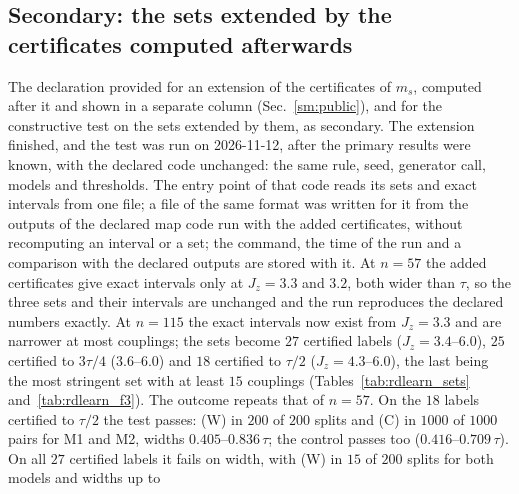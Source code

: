 \documentclass[aps,prx,onecolumn,10pt,nofootinbib,longbibliography,floatfix]{revtex4-2}
\theoremstyle{remark}
\newcommand{\Jz}{J_z}
\newcommand{\ms}{m_s}
\begin{document}
\subsection{Secondary: the sets extended by the certificates computed afterwards}

The declaration provided for an extension of the certificates of $\ms$, computed after it and shown in a separate
column (Sec.~\ref{sm:public}), and for the constructive test on the sets extended by them, as secondary. The
extension finished, and the test was run on 2026-11-12, after the primary results were known, with the declared %
code unchanged: the same rule, seed, generator call, models and thresholds. The entry point of that code reads its
sets and exact intervals from one file; a file of the same format was written for it from the outputs of the
declared map code run with the added certificates, without recomputing an interval or a set; the command, the time
of the run and a comparison with the declared outputs are stored with it. At $n=57$ the added certificates give exact intervals only at %
$\Jz=3.3$ and $3.2$, both wider than $\tau$, so the three sets and their intervals are unchanged and the run %
reproduces the declared numbers exactly. At $n=115$ the exact intervals now exist from $\Jz=3.3$ and are narrower %
at most couplings; the sets become $27$ certified labels ($\Jz=3.4$--$6.0$), $25$ certified to $3\tau/4$ %
($3.6$--$6.0$) and $18$ certified to $\tau/2$ ($\Jz=4.3$--$6.0$), the last being the most stringent set with at %
least $15$ couplings (Tables~\ref{tab:rdlearn_sets} and~\ref{tab:rdlearn_f3}). The outcome repeats that of $n=57$. %
On the $18$ labels certified to $\tau/2$ the test passes: (W) in $200$ of $200$ splits and (C) in $1000$ of $1000$ %
pairs for M1 and M2, widths $0.405$--$0.836\,\tau$; the control passes too ($0.416$--$0.709\,\tau$). On all $27$ %
certified labels it fails on width, with (W) in $15$ of $200$ splits for both models and widths up to %
\end{document}
